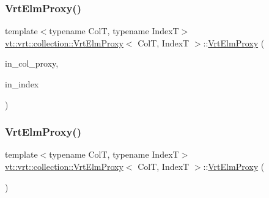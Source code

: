 \mbox{\label{structvt_1_1vrt_1_1collection_1_1_vrt_elm_proxy_a99d6e37bddf85ab0b3030ce7ab519f04}} 
\subsubsection{\texorpdfstring{Vrt\+Elm\+Proxy()}{VrtElmProxy()}\hspace{0.1cm}{\footnotesize\ttfamily [2/5]}}
{\footnotesize\ttfamily template$<$typename ColT, typename IndexT$>$ \\
\hyperlink{structvt_1_1vrt_1_1collection_1_1_vrt_elm_proxy}{vt\+::vrt\+::collection\+::\+Vrt\+Elm\+Proxy}$<$ ColT, IndexT $>$\+::\hyperlink{structvt_1_1vrt_1_1collection_1_1_vrt_elm_proxy}{Vrt\+Elm\+Proxy} (\begin{DoxyParamCaption}\item[{\hyperlink{namespacevt_a1b417dd5d684f045bb58a0ede70045ac}{Virtual\+Proxy\+Type} const \&}]{in\+\_\+col\+\_\+proxy,  }\item[{IndexT const \&}]{in\+\_\+index }\end{DoxyParamCaption})\hspace{0.3cm}{\ttfamily [inline]}}

\mbox{\label{structvt_1_1vrt_1_1collection_1_1_vrt_elm_proxy_a9dcec470fca637dedf608a402facca14}} 
\subsubsection{\texorpdfstring{Vrt\+Elm\+Proxy()}{VrtElmProxy()}\hspace{0.1cm}{\footnotesize\ttfamily [3/5]}}
{\footnotesize\ttfamily template$<$typename ColT, typename IndexT$>$ \\
\hyperlink{structvt_1_1vrt_1_1collection_1_1_vrt_elm_proxy}{vt\+::vrt\+::collection\+::\+Vrt\+Elm\+Proxy}$<$ ColT, IndexT $>$\+::\hyperlink{structvt_1_1vrt_1_1collection_1_1_vrt_elm_proxy}{Vrt\+Elm\+Proxy} (\begin{DoxyParamCaption}{ }\end{DoxyParamCaption})\hspace{0.3cm}{\ttfamily [default]}}


